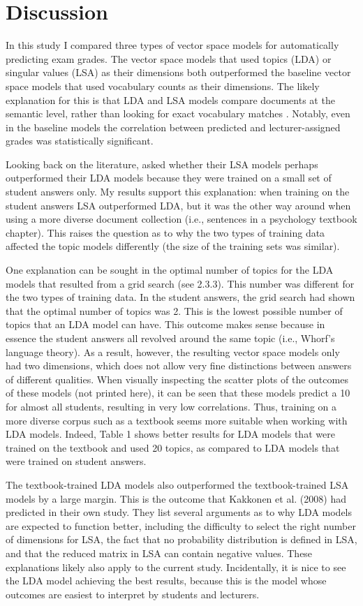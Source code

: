 \documentclass[a4paper,10pt,twoside]{article}
\begin{document}
\section{Discussion}
In this study I compared three types of vector space models for automatically predicting exam grades. The vector space models that used topics (LDA) or singular values (LSA) as their dimensions both outperformed the baseline vector space models that used vocabulary counts as their dimensions. The likely explanation for this is that LDA and LSA models compare documents at the semantic level, rather than looking for exact vocabulary matches \cite{kakkonen2008}. Notably, even in the baseline models the correlation between predicted and lecturer-assigned grades was statistically significant.

Looking back on the literature,  asked whether their LSA models perhaps outperformed their LDA models because they were trained on a small set of student answers only. My results support this explanation: when training on the student answers LSA outperformed LDA, but it was the other way around when using a more diverse document collection (i.e., sentences in a psychology textbook chapter). This raises the question as to why the two types of training data affected the topic models differently (the size of the training sets was similar).

One explanation can be sought in the optimal number of topics for the LDA models that resulted from a grid search (see 2.3.3). This number was different for the two types of training data. In the student answers, the grid search had shown that the optimal number of topics was 2. This is the lowest possible number of topics that an LDA model can have. This outcome makes sense because in essence the student answers all revolved around the same topic (i.e., Whorf's language theory). As a result, however, the resulting vector space models only had two dimensions, which does not allow very fine distinctions between answers of different qualities. When visually inspecting the scatter plots of the outcomes of these models (not printed here), it can be seen that these models predict a 10 for almost all students, resulting in very low correlations. Thus, training on a more diverse corpus such as a textbook seems more suitable when working with LDA models. Indeed, Table 1 shows better results for LDA models that were trained on the textbook and used 20 topics, as compared to LDA models that were trained on student answers.

The textbook-trained LDA models also outperformed the textbook-trained LSA models by a large margin. This is the outcome that Kakkonen et al. (2008) had predicted in their own study. They list several arguments as to why LDA models are expected to function better, including the difficulty to select the right number of dimensions for LSA, the fact that no probability distribution is defined in LSA, and that the reduced matrix in LSA can contain negative values. These explanations likely also apply to the current study. Incidentally, it is nice to see the LDA model achieving the best results, because this is the model whose outcomes are easiest to interpret by students and lecturers.
\end{document}
